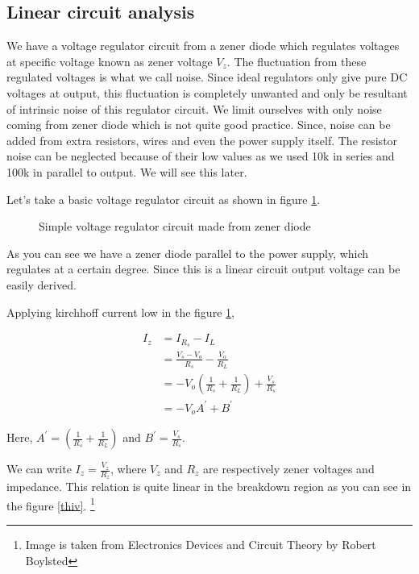\documentclass[draft,12pt]{article}
\begin{document}
\subsection{Linear circuit analysis \label{lca}}


We have a voltage regulator circuit from a zener diode which regulates voltages at specific voltage known as zener voltage $V_{z}$. The fluctuation from these regulated voltages is what we call noise. Since ideal regulators only give pure DC voltages at output, this fluctuation is completely unwanted and only be resultant of intrinsic noise of this regulator circuit.  We limit ourselves with only noise coming from zener diode which is not quite good practice. Since, noise can be added from extra resistors, wires and even the power supply itself. The resistor noise can be neglected because of their low values as we used 10k in series and 100k in parallel to output. We will see this later.

Let’s take a basic voltage regulator circuit as shown in figure \ref{thcir1}.

\begin{figure}[hbt!]
\caption{Simple voltage regulator circuit made from zener diode \label{thcir1}}
\end{figure}

As you can see we have a zener diode parallel to the power supply, which regulates at a certain degree. Since this is a linear circuit output voltage can be easily derived.

Applying kirchhoff current low in the figure \ref{thcir1},


\begin{align*}
I_{z} & = I_{R_s} -I_{L}\\
& = \frac{V_s-V_o}{R_s}-\frac{V_o}{R_L}\\
& = -V_o(\frac{1}{R_s}+\frac{1}{R_L})+ \frac{V_s}{R_s}\\
& = -V_oA^{\prime}+B^{\prime}
\end{align*}

Here, $A^{\prime} = (\frac{1}{R_s}+\frac{1}{R_L})$ and $B^{\prime} = \frac{V_s}{R_s}$.  

We can write $I_z = \frac{V_z}{R_z}$, where $V_z$ and $R_z$ are respectively zener voltages and impedance.  This relation is quite linear in the breakdown region as you can see in the figure \ref{thiv}. \footnote{Image is taken from Electronics Devices and Circuit Theory by Robert Boylsted}
\end{document}
